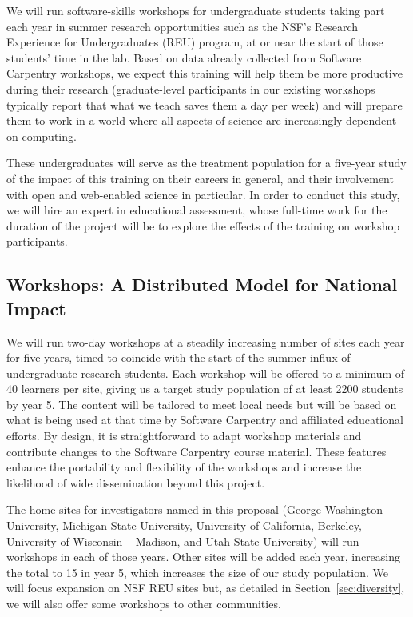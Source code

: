 \documentclass{proposalnsf}
\begin{document}
We will run software-skills workshops for undergraduate students
taking part each year in summer research opportunities such as the
NSF's Research Experience for Undergraduates (REU) program, at or near
the start of those students' time in the lab.  Based on data already
collected from Software Carpentry workshops, we expect this training
will help them be more productive during their research (graduate-level
participants in our existing workshops typically report that what we
teach saves them a day per week) and will prepare them to work in a
world where all aspects of science are increasingly dependent on
computing.

These undergraduates will serve as the treatment population for a
five-year study of the impact of this training on their careers in
general, and their involvement with open and web-enabled science in
particular.  In order to conduct this study, we will hire an expert in
educational assessment, whose full-time work for the duration of the
project will be to explore the effects of the training on workshop
participants.

\subsection{Workshops: A Distributed Model for National Impact}

We will run two-day workshops at a steadily increasing number of sites
each year for five years, timed to coincide with the start of the
summer influx of undergraduate research students.  Each workshop will
be offered to a minimum of 40 learners per site, giving us a target
study population of at least 2200 students by year 5.  The content will be
tailored to meet local needs but will be based on what is being used
at that time by Software Carpentry and affiliated educational efforts.
By design, it is straightforward to adapt workshop materials and
contribute changes to the Software Carpentry course material.  These
features enhance the portability and flexibility of the workshops and
increase the likelihood of wide dissemination beyond this project.

The home sites for investigators named in this proposal (George
Washington University, Michigan State University, University of
California, Berkeley, University of Wisconsin -- Madison, and
Utah State University) will run workshops in each of those years.
Other sites will be added each year, increasing the total to 15 in
year 5, which increases the size of our study population.  We will
focus expansion on NSF REU sites \cite{nsfreu} but, as detailed in
Section~\ref{sec:diversity}, we will also offer some workshops to
other communities.
\end{document}
